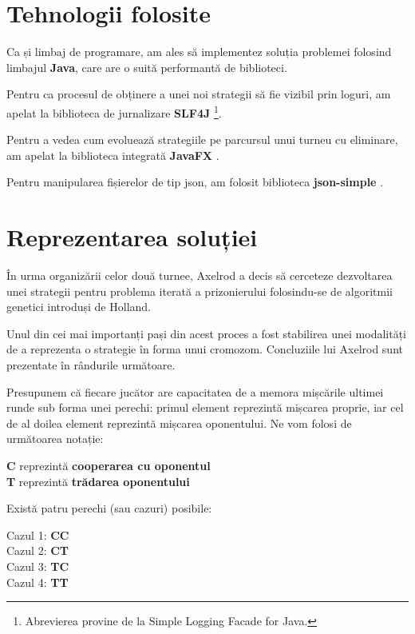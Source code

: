 \section{Tehnologii folosite}

Ca și limbaj de programare, am ales să implementez soluția problemei folosind limbajul \textbf{Java}, care are o suită performantă de biblioteci. 

Pentru ca procesul de obținere a unei noi strategii să fie vizibil prin loguri, am apelat la biblioteca de jurnalizare \textbf{SLF4J} \cite{slf4j} \footnote{Abrevierea provine de la Simple Logging Facade for Java.}. 

Pentru a vedea cum evoluează strategiile pe parcursul unui turneu cu eliminare, am apelat la biblioteca integrată \textbf{JavaFX} \cite{javaFX}. 

Pentru manipularea fișierelor de tip json, am folosit biblioteca \textbf{json-simple} \cite{json-simple}.  

\section{Reprezentarea soluției}

În urma organizării celor două turnee, Axelrod \cite{the_evolution_of_cooperation_axelrod} a decis să cerceteze dezvoltarea unei strategii pentru problema iterată a prizonierului folosindu-se de algoritmii genetici introduși de Holland. 

\clearpage

Unul din cei mai importanți pași din acest proces a fost stabilirea unei modalități de a reprezenta o strategie în forma unui cromozom. Concluziile lui Axelrod sunt prezentate în rândurile următoare.

Presupunem că fiecare jucător are capacitatea de a memora mișcările ultimei runde sub forma unei perechi: primul element reprezintă mișcarea proprie, iar cel de al doilea element reprezintă mișcarea oponentului. Ne vom folosi de următoarea notație:
\begin{center}
	\textbf{C} reprezintă \textbf{cooperarea cu oponentul}\\
	\textbf{T} reprezintă \textbf{trădarea oponentului}  
\end{center}
Există patru perechi (sau cazuri) posibile:
\begin{center}
	Cazul 1: \textbf{CC}\\
	Cazul 2: \textbf{CT}\\
	Cazul 3: \textbf{TC}\\
	Cazul 4: \textbf{TT}\\
\end{center}

